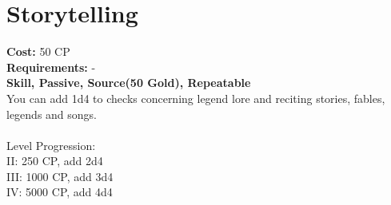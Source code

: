 \section{Storytelling}
\textbf{Cost:} 50 CP\\
\textbf{Requirements:} -\\
\textbf{Skill, Passive, Source(50 Gold), Repeatable}\\
You can add 1d4 to checks concerning legend lore and reciting stories, fables, legends and songs.\\ 
\\
Level Progression:\\
II: 250 CP, add 2d4\\
III: 1000 CP, add 3d4\\
IV: 5000 CP, add 4d4\\